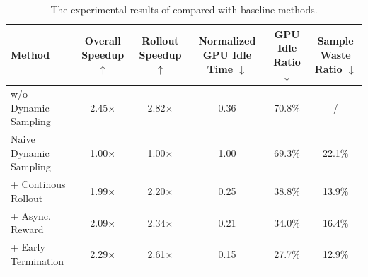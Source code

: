 \begin{table}[htbp]
    \centering
    \small
    \begin{tabular}{l|ccccc}
    \toprule
    \textbf{Method} & \makecell{\textbf{Overall}\\\textbf{Speedup $\uparrow$}} & \makecell{\textbf{Rollout}\\\textbf{Speedup $\uparrow$}} & 
    \makecell{\textbf{Normalized}\\\textbf{GPU Idle Time $\downarrow$}} & \makecell{\textbf{GPU Idle}\\\textbf{Ratio $\downarrow$}} & \makecell{\textbf{Sample}\\\textbf{Waste Ratio $\downarrow$}} \\
    \midrule
    w/o Dynamic Sampling & 2.45$\times$ & 2.82$\times$ & 0.36 & 70.8\% & / \\
    \midrule
    Naive Dynamic Sampling & 1.00$\times$ & 1.00$\times$ & 1.00 & 69.3\% & 22.1\% \\
    + Continous Rollout & 1.99$\times$ & 2.20$\times$ & 0.25 & 38.8\% & 13.9\% \\
    + Async. Reward & 2.09$\times$ & 2.34$\times$ & 0.21 & 34.0\% & 16.4\% \\
    + Early Termination & 2.29$\times$ & 2.61$\times$ & 0.15 & 27.7\% & 12.9\% \\
    \bottomrule
    \end{tabular}
    \caption{
        The experimental results of \rlsys{} compared with baseline methods. 
    }
    \label{tab:rlinfra:train}
\end{table}
